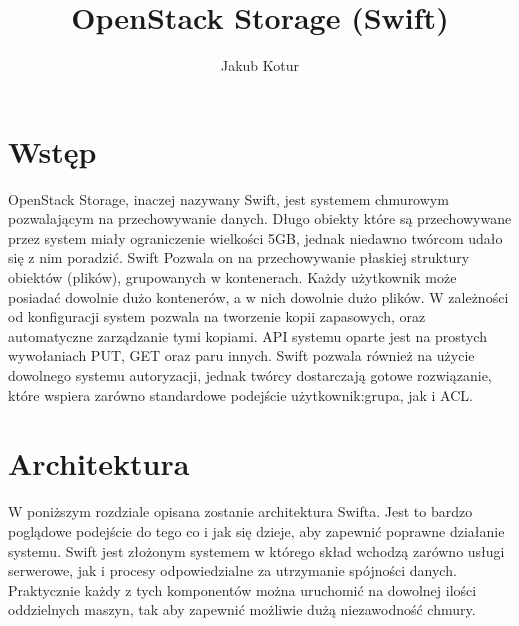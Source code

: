 


\title{OpenStack Storage (Swift)}
\author{Jakub Kotur}



\maketitle

\section{Wstęp}

\nocite{openstack}

OpenStack Storage, inaczej nazywany Swift, jest systemem chmurowym pozwalającym na przechowywanie danych. Długo obiekty które są przechowywane przez system miały ograniczenie wielkości 5GB, jednak niedawno twórcom udało się z nim poradzić. Swift Pozwala on na przechowywanie płaskiej struktury obiektów (plików), grupowanych w kontenerach. Każdy użytkownik może posiadać dowolnie dużo kontenerów, a w nich dowolnie dużo plików. W zależności od konfiguracji system pozwala na tworzenie kopii zapasowych, oraz automatyczne zarządzanie tymi kopiami. API systemu oparte jest na prostych wywołaniach PUT, GET oraz paru innych. Swift pozwala również na użycie dowolnego systemu autoryzacji, jednak twórcy dostarczają gotowe rozwiązanie, które wspiera zarówno standardowe podejście użytkownik:grupa, jak i ACL.



\section{Architektura}\label{sec:architektura}

W poniższym rozdziale opisana zostanie architektura Swifta. Jest to bardzo poglądowe podejście do tego co i jak się dzieje, aby zapewnić poprawne działanie systemu. Swift jest złożonym systemem w którego skład wchodzą zarówno usługi serwerowe, jak i procesy odpowiedzialne za utrzymanie spójności danych. Praktycznie każdy z tych komponentów można uruchomić na dowolnej ilości oddzielnych maszyn, tak aby zapewnić możliwie dużą niezawodność chmury.

